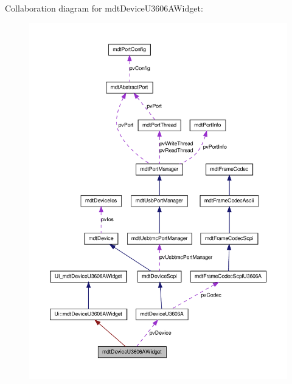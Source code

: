 Collaboration diagram for mdtDeviceU3606AWidget:
\nopagebreak
\begin{figure}[H]
\begin{center}
\leavevmode
\includegraphics[width=400pt]{classmdt_device_u3606_a_widget__coll__graph}
\end{center}
\end{figure}
